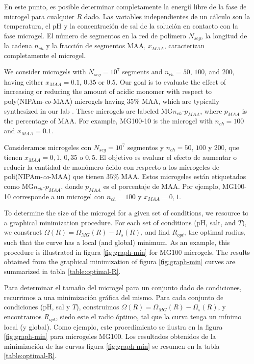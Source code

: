 En este punto, es posible determinar completamente la energí\'i libre de la fase de microgel para cualquier $R$ dado.
Las variables independientes de un c\'alculo son la temperatura, el pH y la concentraci\'on de sal de la soluci\'on en contacto con la fase microgel.
El n\'umero de segmentos en la red de pol\'imero $N_{seg}$, la longitud de la cadena $n_{ch}$ y la fracci\'on de segmentos MAA, $x_{MAA}$, caracterizan completamente el microgel.

We consider microgels with $N_{seg}=10^7$ segments and $n_{ch}=50$, $100$, and $200$, having either $x_{MAA}=0.1$, $0.35$ or $0.5$.
Our goal is to evaluate the effect of increasing or reducing the amount of acidic monomer with respect to poly(NIPAm-\emph{co}-MAA) microgels having $35\%$ MAA, which are typically synthesized in our lab .
These microgels are labeled MG$n_{ch}$-$p_{MAA}$, where $p_{MAA}$ is the percentage of MAA.
For example, MG100-10 is the microgel with  $n_{ch}=100$ and $x_{MAA}=0.1$.


Consideramos microgeles con $N_{seg}=10^7$ segmentos y $n_{ch}=50$, $100$ y $200$, que tienen $x_{MAA}=0,1$, $0,35$ o $0,5$.
El objetivo es evaluar el efecto de aumentar o reducir la cantidad de mon\'omero \'acido con respecto a los microgeles de poli(NIPAm-\emph{co}-MAA) que tienen $35\%$ MAA. %
Estos microgeles est\'an etiquetados como MG$n_{ch}$-$p_{MAA}$, donde $p_{MAA}$ es el porcentaje de MAA.
Por ejemplo, MG100-10 corresponde a un  microgel con $n_{ch}=100$ y $x_{MAA}=0,1$.



To determine the size of the microgel for a given set of conditions, we resource to a graphical minimization procedure.
For each set of conditions (pH, salt, and $T$), we construct $\Omega(R)=\Omega_{MG}(R)-\Omega_{s}(R)$, and find $R_{opt}$, the optimal radius, such that the curve has a local (and global) minimum.
As an example, this procedure is illustrated in figura \ref{fig:graph-min} for MG100 microgels.
The results obtained from the graphical minimization of figura \ref{fig:graph-min} curves are summarized in tabla \ref{table:optimal-R}.

Para determinar el tama\~no del microgel para un conjunto dado de condiciones, recurrimos a una minimizaci\'on gr\'afica del mismo.
Para cada conjunto de condiciones (pH, sal y $T$), construimos $\Omega(R)=\Omega_{MG}(R)-\Omega_{s}(R)$, y encontramos $R_{opt }$, siedo este el radio \'optimo, tal que la curva tenga un m\'inimo local (y global).
Como ejemplo, este procedimiento se ilustra en la figura \ref{fig:graph-min} para microgeles MG100.
Los resultados obtenidos de la minimizaci\'on de las curvas figura \ref{fig:graph-min} se resumen en la tabla \ref{table:optimal-R}.

